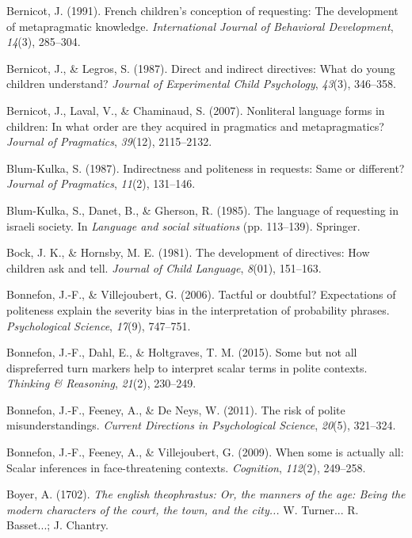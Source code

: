 \documentclass[oneside]{report}
\begin{document}
\hypertarget{ref-bernicot1991}{}
Bernicot, J. (1991). French children's conception of requesting: The
development of metapragmatic knowledge. \emph{International Journal of
Behavioral Development}, \emph{14}(3), 285--304.

\hypertarget{ref-bernicot1987}{}
Bernicot, J., \& Legros, S. (1987). Direct and indirect directives: What
do young children understand? \emph{Journal of Experimental Child
Psychology}, \emph{43}(3), 346--358.

\hypertarget{ref-bernicot2007}{}
Bernicot, J., Laval, V., \& Chaminaud, S. (2007). Nonliteral language
forms in children: In what order are they acquired in pragmatics and
metapragmatics? \emph{Journal of Pragmatics}, \emph{39}(12), 2115--2132.

\hypertarget{ref-blumkulka1987}{}
Blum-Kulka, S. (1987). Indirectness and politeness in requests: Same or
different? \emph{Journal of Pragmatics}, \emph{11}(2), 131--146.

\hypertarget{ref-blum-kulka1985}{}
Blum-Kulka, S., Danet, B., \& Gherson, R. (1985). The language of
requesting in israeli society. In \emph{Language and social situations}
(pp. 113--139). Springer.

\hypertarget{ref-bock1981}{}
Bock, J. K., \& Hornsby, M. E. (1981). The development of directives:
How children ask and tell. \emph{Journal of Child Language},
\emph{8}(01), 151--163.

\hypertarget{ref-bonnefon2006}{}
Bonnefon, J.-F., \& Villejoubert, G. (2006). Tactful or doubtful?
Expectations of politeness explain the severity bias in the
interpretation of probability phrases. \emph{Psychological Science},
\emph{17}(9), 747--751.

\hypertarget{ref-bonnefon2015}{}
Bonnefon, J.-F., Dahl, E., \& Holtgraves, T. M. (2015). Some but not all
dispreferred turn markers help to interpret scalar terms in polite
contexts. \emph{Thinking \& Reasoning}, \emph{21}(2), 230--249.

\hypertarget{ref-bonnefon2011risk}{}
Bonnefon, J.-F., Feeney, A., \& De Neys, W. (2011). The risk of polite
misunderstandings. \emph{Current Directions in Psychological Science},
\emph{20}(5), 321--324.

\hypertarget{ref-bonnefon2009}{}
Bonnefon, J.-F., Feeney, A., \& Villejoubert, G. (2009). When some is
actually all: Scalar inferences in face-threatening contexts.
\emph{Cognition}, \emph{112}(2), 249--258.

\hypertarget{ref-boyer1702}{}
Boyer, A. (1702). \emph{The english theophrastus: Or, the manners of the
age: Being the modern characters of the court, the town, and the
city...} W. Turner... R. Basset...; J. Chantry.
\end{document}
